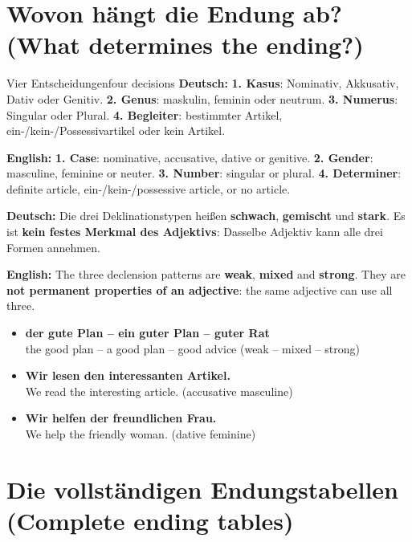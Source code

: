 \documentclass[a4paper,11pt]{article}
\newcommand{\GermanText}[1]{\textbf{Deutsch: }#1\par}
\newcommand{\EnglishText}[1]{{\small\color{SoftGray}\textbf{English: }#1\par}}
\newcommand{\ExampleItem}[2]{\item \textbf{#1}\\{\small\color{SoftGray}#2}}
\begin{document}
\section{Wovon hängt die Endung ab? \textnormal{(What determines the ending?)}}
\begin{grammarentry}{Vier Entscheidungen}{four decisions}
\GermanText{\textbf{1. Kasus}: Nominativ, Akkusativ, Dativ oder Genitiv. \textbf{2. Genus}: maskulin, feminin oder neutrum. \textbf{3. Numerus}: Singular oder Plural. \textbf{4. Begleiter}: bestimmter Artikel, ein-/kein-/Possessivartikel oder kein Artikel.}
\EnglishText{\textbf{1. Case}: nominative, accusative, dative or genitive. \textbf{2. Gender}: masculine, feminine or neuter. \textbf{3. Number}: singular or plural. \textbf{4. Determiner}: definite article, ein-/kein-/possessive article, or no article.}
\GermanText{Die drei Deklinationstypen heißen \textbf{schwach}, \textbf{gemischt} und \textbf{stark}. Es ist \textbf{kein festes Merkmal des Adjektivs}: Dasselbe Adjektiv kann alle drei Formen annehmen.}
\EnglishText{The three declension patterns are \textbf{weak}, \textbf{mixed} and \textbf{strong}. They are \textbf{not permanent properties of an adjective}: the same adjective can use all three.}
\end{grammarentry}
\begin{exbox}\begin{itemize}
\ExampleItem{der gute Plan -- ein guter Plan -- guter Rat}{the good plan -- a good plan -- good advice (weak -- mixed -- strong)}
\ExampleItem{Wir lesen den interessanten Artikel.}{We read the interesting article. (accusative masculine)}
\ExampleItem{Wir helfen der freundlichen Frau.}{We help the friendly woman. (dative feminine)}
\end{itemize}\end{exbox}

\section{Die vollständigen Endungstabellen \textnormal{(Complete ending tables)}}
\end{document}
